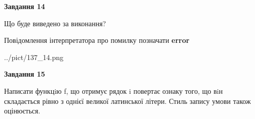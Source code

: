\documentclass[11pt, ukrainian]{article}
\begin{document}
{\begin {large}
{\begin {center}\textbf{Завдання 14}\end {center}}\par
Що буде виведено за виконання? \par
Повідомлення інтерпретатора про помилку позначати \textbf{error}

\begin{center}
	{../pict/137_14.png}
\end{center}
\newpage

{\begin {center}\textbf{Завдання 15}\end {center}}\par

Написати функцiю f, що отримує рядок i повертає ознаку того, що вiн складається рівно з однієї великої латинської літери. Стиль запису умови також оцінюється.\par
\newpage

\end {large}}
\end{document}
